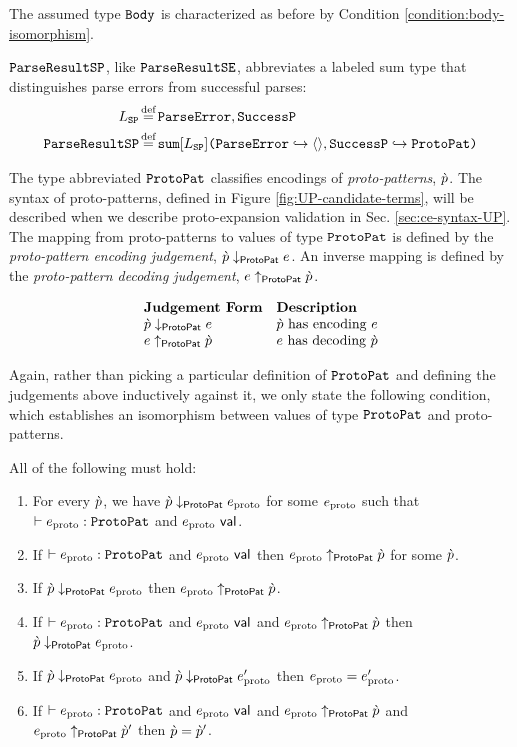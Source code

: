 {{{{\begin{enumerate}
The assumed type $\mathtt{Body}$ is characterized as before by Condition \ref{condition:body-isomorphism}.

$\mathtt{ParseResultSP}$, like $\mathtt{ParseResultSE}$, abbreviates a labeled sum type that distinguishes parse errors from successful parses:
\begin{align*}
L_\mathtt{SP} & \defeq \lbltxt{ParseError}, \lbltxt{SuccessP}\\
\tParseResultPat & \defeq \asum{L_\mathtt{SP}}{
  \mapitem{\lbltxt{ParseError}}{\prodt{}}, 
  \mapitem{\lbltxt{SuccessP}}{\tCEPat}
}
\end{align*} %

The type abbreviated $\mathtt{ProtoPat}$ classifies encodings of \emph{proto-patterns}, $\grave{p}$. The syntax of proto-patterns, defined in Figure \ref{fig:UP-candidate-terms}, will be described when we describe proto-expansion validation in Sec. \ref{sec:ce-syntax-UP}. The mapping from proto-patterns to values of type $\mathtt{ProtoPat}$ is defined by the \emph{proto-pattern encoding judgement}, $\grave{p} \downarrow_\mathsf{ProtoPat} e$. An inverse mapping is defined by the \emph{proto-pattern decoding judgement}, $e \uparrow_\mathsf{ProtoPat} \grave{p}$.

\[\begin{array}{ll}
\textbf{Judgement Form} & \textbf{Description}\\
\grave{p} \downarrow_\mathsf{ProtoPat} e & \text{$\grave{p}$ has encoding $e$}\\
e \uparrow_\mathsf{ProtoPat} \grave{p} & \text{$e$ has decoding $\grave{p}$}
\end{array}\]

Again, rather than picking a particular definition of $\mathtt{ProtoPat}$ and defining the judgements above inductively against it, we only state the following condition, which establishes an isomorphism between values of type $\mathtt{ProtoPat}$ and proto-patterns.

\begingroup
\def\thetheorem{\ref{condition:proto-pattern-isomorphism}}
\begin{condition} All of the following must hold:
\begin{enumerate}
\item For every $\grave{p}$, we have $\grave{p} \downarrow_\mathsf{ProtoPat} e_\text{proto}$ for some $e_\text{proto}$ such that $\vdash e_\text{proto} : \mathtt{ProtoPat}$ and $e_\text{proto}~\mathsf{val}$.
\item If $\vdash e_\text{proto} : \mathtt{ProtoPat}$ and $e_\text{proto}~\mathsf{val}$ then $e_\text{proto} \uparrow_\mathsf{ProtoPat} \grave{p}$ for some $\grave{p}$.
\item If $\grave{p} \downarrow_\mathsf{ProtoPat} e_\text{proto}$ then $e_\text{proto} \uparrow_\mathsf{ProtoPat} \grave{p}$.
\item If $\vdash e_\text{proto} : \mathtt{ProtoPat}$ and $e_\text{proto}~\mathsf{val}$ and $e_\text{proto} \uparrow_\mathsf{ProtoPat} \grave{p}$ then $\grave{p} \downarrow_\mathsf{ProtoPat} e_\text{proto}$.
\item If $\grave{p} \downarrow_\mathsf{ProtoPat} e_\text{proto}$ and $\grave{p} \downarrow_\mathsf{ProtoPat} e_\text{proto}'$ then $e_\text{proto}=e_\text{proto}'$.
\item If $\vdash e_\text{proto} : \mathtt{ProtoPat}$ and $e_\text{proto}~\mathsf{val}$ and $e_\text{proto} \uparrow_\mathsf{ProtoPat} \grave{p}$ and $e_\text{proto} \uparrow_\mathsf{ProtoPat} \grave{p}'$ then $\grave{p}=\grave{p}'$.
\end{enumerate}
\end{condition}
\endgroup


\end{enumerate}}}}}
